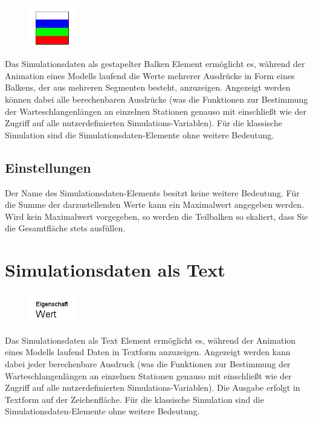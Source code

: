 \begin{figure}
\vspace{-22pt}
\includegraphics[width=2cm]{imageModelElementAnimationBarStack.png}
\vspace{-22pt}
\end{figure}

Das Simulationsdaten als gestapelter Balken Element ermöglicht es, während der Animation eines Modells laufend die Werte
mehrerer Ausdrücke in Form eines Balkens, der aus mehreren Segmenten besteht, anzuzeigen. Angezeigt werden können dabei
alle berechenbaren Ausdrücke (was die Funktionen zur Bestimmung der Warteschlangenlängen an einzelnen Stationen genauso
mit einschließt wie der Zugriff auf alle nutzerdefinierten Simulations-Variablen). Für die klassische Simulation sind die
Simulationsdaten-Elemente ohne weitere Bedeutung.

\subsection*{Einstellungen}

Der Name des Simulationsdaten-Elements besitzt keine weitere Bedeutung.
Für die Summe der darzustellenden Werte kann ein Maximalwert angegeben werden.
Wird kein Maximalwert vorgegeben, so werden die Teilbalken so skaliert,
dass Sie die Gesamtfläche stets ausfüllen.


\section{Simulationsdaten als Text}
\label{ref:ModelElementAnimationText}

\begin{figure}
\vspace{-22pt}
\includegraphics[width=2cm]{imageModelElementAnimationText.png}
\vspace{-22pt}
\end{figure}

Das Simulationsdaten als Text Element ermöglicht es, während der Animation eines Modells laufend Daten in Textform anzuzeigen.
Angezeigt werden kann dabei jeder berechenbare Ausdruck (was die Funktionen zur Bestimmung der Warteschlangenlängen
an einzelnen Stationen genauso mit einschließt wie der Zugriff auf alle nutzerdefinierten Simulations-Variablen).
Die Ausgabe erfolgt in Textform auf der Zeichenfläche. Für die klassische Simulation sind die Simulationsdaten-Elemente
ohne weitere Bedeutung.

